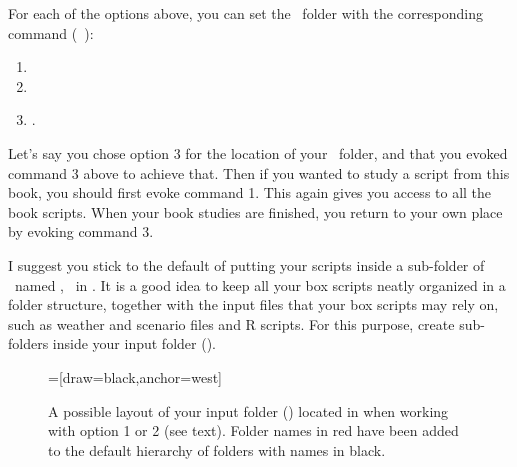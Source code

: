 For each of the options above, you can set the \ushome\ folder with the corresponding command (\cf\ ):
\begin{enumerate}
\item {}
\item {}
\item {}.
\end{enumerate}

Let's say you chose option 3 for the location of your \ushome\ folder, and that you evoked command 3 above to achieve that. Then if you wanted to study a script from this book, you should first evoke command 1. This again gives you access to all the book scripts. When your book studies are finished, you return to your own place by evoking command 3.

I suggest you stick to the default of putting your scripts inside a sub-folder of \ushome\ named , \eg\ in . It is a good idea to keep all your box scripts neatly organized in a folder structure, together with the input files that your box scripts may rely on, such as weather and scenario files and R scripts. For this purpose, create sub-folders inside your input folder  ().

\begin {figure} [ht]
\centering
{}=[draw=black,anchor=west]
\caption{A possible layout of your input folder () located in  when working with option 1 or 2 (see text). Folder names in red have been added to the default hierarchy of folders with names in black.}
\label{fig:layout-input-folder}
\end{figure}

